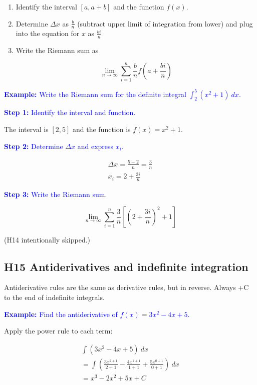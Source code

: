 \documentclass[letterpaper, 12pt]{article}
\newcommand{\example}[1]{\textcolor{blue}{\textbf{Example:} #1}}
\newcommand{\step}[2]{\textcolor{blue}{\textbf{Step #1:} #2}}
\begin{document}
\begin{enumerate}
\item Identify the interval $[a, a+b]$ and the function $f(x)$.
\item Determine $\Delta x$ as $\frac{b}{n}$ (subtract upper limit of integration from lower) and plug into the equation for $x$ as $\frac{bi}{n}$
\item Write the Riemann sum as

$$\lim_{n \to \infty} \sum_{i=1}^{n} \frac{b}{n} f\left(a + \frac{bi}{n}\right)$$

\end{enumerate}

\example{Write the Riemann sum for the definite integral $\displaystyle \int_{2}^{5} (x^2 + 1) \: dx$.}

\step{1}{Identify the interval and function.}

The interval is $[2, 5]$ and the function is $f(x) = x^2 + 1$.

\step{2}{Determine $\Delta x$ and express $x_i$.}

\begin{gather*}
\Delta x = \frac{5 - 2}{n} = \frac{3}{n} \\
x_i = 2 + \frac{3i}{n}
\end{gather*}

\step{3}{Write the Riemann sum.}

$$\boxed{\lim_{n \to \infty} \sum_{i=1}^{n} \frac{3}{n} \left[ \left(2 + \frac{3i}{n}\right)^2 + 1 \right]}$$

{\large(H14 intentionally skipped.)}

\subsection*{H15 Antiderivatives and indefinite integration}

Antiderivative rules are the same as derivative rules, but in reverse. Always +C to the end of indefinite integrals.

\example{Find the antiderivative of $\displaystyle f(x) = 3x^2 - 4x + 5$.}

Apply the power rule to each term:

\begin{gather*}
\int (3x^2 - 4x + 5) \: dx \\
= \int (\frac{3x^{2+1}}{2+1} - \frac{4x^{1+1}}{1+1} + \frac{5x^{0+1}}{0+1}) \: dx \\
= \boxed{x^3 - 2x^2 + 5x + C}
\end{gather*}
\end{document}
